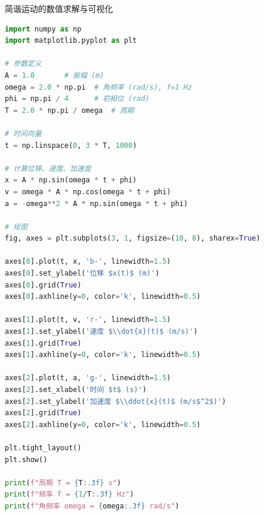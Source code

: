 \begin{mycode}{简谐运动的数值求解与可视化}
\begin{lstlisting}[language=Python]
import numpy as np
import matplotlib.pyplot as plt

# 参数定义
A = 1.0       # 振幅 (m)
omega = 2.0 * np.pi  # 角频率 (rad/s), f=1 Hz
phi = np.pi / 4      # 初相位 (rad)
T = 2.0 * np.pi / omega  # 周期

# 时间向量
t = np.linspace(0, 3 * T, 1000)

# 计算位移、速度、加速度
x = A * np.sin(omega * t + phi)
v = omega * A * np.cos(omega * t + phi)
a = -omega**2 * A * np.sin(omega * t + phi)

# 绘图
fig, axes = plt.subplots(3, 1, figsize=(10, 8), sharex=True)

axes[0].plot(t, x, 'b-', linewidth=1.5)
axes[0].set_ylabel('位移 $x(t)$ (m)')
axes[0].grid(True)
axes[0].axhline(y=0, color='k', linewidth=0.5)

axes[1].plot(t, v, 'r-', linewidth=1.5)
axes[1].set_ylabel('速度 $\\dot{x}(t)$ (m/s)')
axes[1].grid(True)
axes[1].axhline(y=0, color='k', linewidth=0.5)

axes[2].plot(t, a, 'g-', linewidth=1.5)
axes[2].set_xlabel('时间 $t$ (s)')
axes[2].set_ylabel('加速度 $\\ddot{x}(t)$ (m/s$^2$)')
axes[2].grid(True)
axes[2].axhline(y=0, color='k', linewidth=0.5)

plt.tight_layout()
plt.show()

print(f"周期 T = {T:.3f} s")
print(f"频率 f = {1/T:.3f} Hz")
print(f"角频率 omega = {omega:.3f} rad/s")
\end{lstlisting}
\end{mycode}
